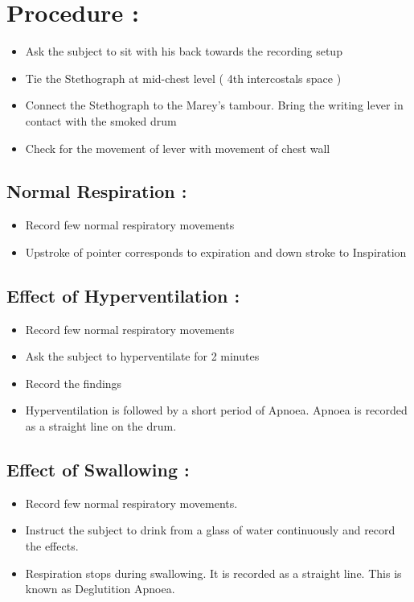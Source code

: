 \documentclass[a4paper,12pt]{book}
\begin{document}
\section*{Procedure :}
\begin{itemize}
\item{Ask the subject to sit with his back towards the recording setup}
\item{Tie the Stethograph at mid-chest level ( 4th intercostals space )}
\item{Connect the Stethograph to the Marey’s tambour. Bring the writing lever in contact with the smoked drum}
\item{Check for the movement of lever with movement of chest wall}
\end{itemize}
\subsection*{Normal Respiration :}
\begin{itemize}
\item{Record few normal respiratory movements}
\item{Upstroke of pointer corresponds to expiration and down stroke to Inspiration}
\end{itemize}
\subsection*{Effect of Hyperventilation :}
\begin{itemize}
\item{Record few normal respiratory movements}
\item{Ask the subject to hyperventilate for 2 minutes}
\item{Record the findings}
\item{Hyperventilation is followed by a short period of Apnoea. Apnoea is recorded as a straight line on the drum.}
\end{itemize}
\subsection*{Effect of Swallowing :}
\begin{itemize}
\item{Record few normal respiratory movements.}
\item{Instruct the subject to drink from a glass of water continuously and record the effects.}
\item{Respiration stops during swallowing. It is recorded as a straight line. This is known as Deglutition Apnoea.}
\end{itemize}
\end{document}
